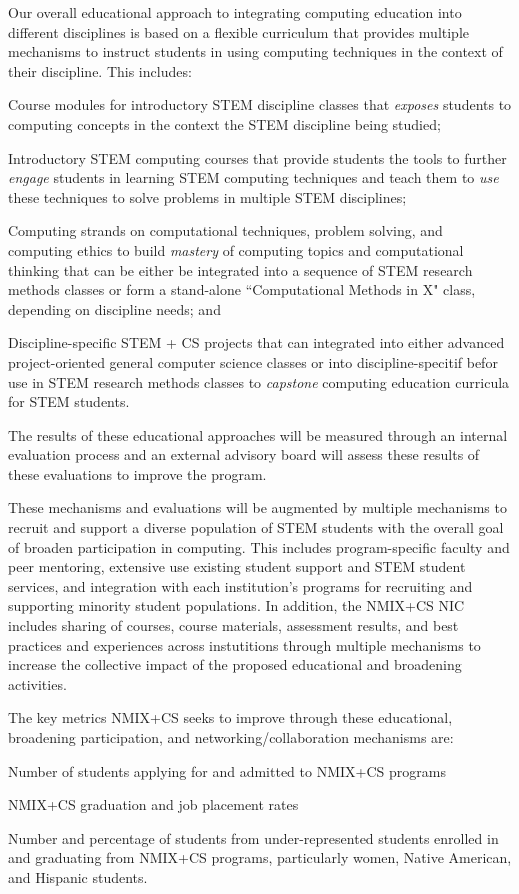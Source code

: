 Our overall educational approach to integrating computing education into different disciplines is based on a flexible curriculum that provides multiple mechanisms to instruct students in using computing techniques in the context of their discipline. This includes:
\begin{tightitemize}
\item Course modules for introductory STEM discipline classes that \emph{exposes} students to computing concepts
  in the context the STEM discipline being studied;
\item Introductory STEM computing courses that provide students the tools to further \emph{engage} students in learning STEM computing techniques and teach them to \emph{use} these techniques to solve problems in multiple STEM disciplines;
\item Computing strands on computational techniques, problem solving, and computing ethics  to build \emph{mastery} of computing topics and computational thinking that can be either be integrated into a sequence of STEM research methods classes or form a stand-alone ``Computational Methods in X" class, depending on discipline needs; and
\item Discipline-specific STEM + CS projects that can integrated into either advanced project-oriented general computer science classes or into discipline-specitif befor use in STEM research methods classes to \emph{capstone} computing education
  curricula for STEM students.
\end{tightitemize}
The results of these educational approaches will be measured through an internal evaluation process and an external advisory board will assess these results of these evaluations to improve the program.

These mechanisms and evaluations will be augmented by multiple mechanisms to recruit and support a diverse population of STEM students with the overall goal of broaden participation in computing. This includes program-specific faculty and peer mentoring, extensive use existing student support and STEM student services, and integration with each institution's programs for recruiting and supporting minority student populations. In addition, the NMIX+CS NIC includes sharing of courses,
course materials, assessment results, and best practices and experiences across instutitions through multiple mechanisms to increase the collective impact of the proposed educational and broadening activities.

The key metrics NMIX+CS seeks to improve through these educational, broadening participation, and networking/collaboration mechanisms are:
\begin{tightitemize}
\item Number of students applying for and admitted to NMIX+CS programs
\item NMIX+CS graduation and job placement rates
\item Number and percentage of students from under-represented students enrolled in and 
  graduating from NMIX+CS programs, particularly women, Native American, and Hispanic students.
\end{tightitemize}

